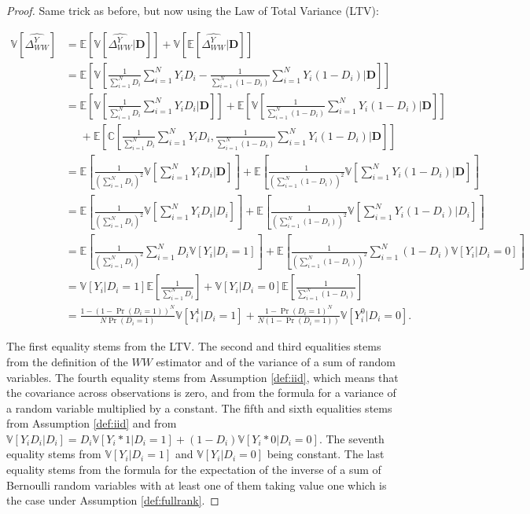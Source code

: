 \documentclass[
]{book}
\newcommand{\esp}[1]{\mathbb{E}[ #1 ]}
\newcommand{\var}[1]{\mathbb{V}[ #1 ]}
\newcommand{\cov}[1]{\mathbb{C}[ #1 ]}
\theoremstyle{definition}
\theoremstyle{definition}
\theoremstyle{definition}
\theoremstyle{definition}
\theoremstyle{remark}
\begin{document}
\begin{proof}
\iffalse{} {Proof. } \fi{}Same trick as before, but now using the Law of Total Variance (LTV):

\begin{align*}
\var{{\hat{\Delta^Y_{WW}}}} & = \esp{\var{\hat{\Delta^Y_{WW}}|\mathbf{D}}}+\var{\esp{\hat{\Delta^Y_{WW}}|\mathbf{D}}}\\
                            & = \esp{\var{\frac{1}{\sum_{i=1}^N D_i}\sum_{i=1}^N Y_iD_i-\frac{1}{\sum_{i=1}^N (1-D_i)}\sum_{i=1}^N Y_i(1-D_i)|\mathbf{D}}} \\
                            & = \esp{\var{\frac{1}{\sum_{i=1}^N D_i}\sum_{i=1}^N Y_iD_i|\mathbf{D}}}+\esp{\var{\frac{1}{\sum_{i=1}^N (1-D_i)}\sum_{i=1}^N Y_i(1-D_i)|\mathbf{D}}}\\
                            & \phantom{=}+\esp{\cov{\frac{1}{\sum_{i=1}^N D_i}\sum_{i=1}^N Y_iD_i,\frac{1}{\sum_{i=1}^N (1-D_i)}\sum_{i=1}^N Y_i(1-D_i)|\mathbf{D}}} \\
                            & = \esp{\frac{1}{(\sum_{i=1}^N D_i)^2}\var{\sum_{i=1}^N Y_iD_i|\mathbf{D}}}+\esp{\frac{1}{(\sum_{i=1}^N (1-D_i))^2}\var{\sum_{i=1}^N Y_i(1-D_i)|\mathbf{D}}} \\
                            & = \esp{\frac{1}{(\sum_{i=1}^N D_i)^2}\var{\sum_{i=1}^N Y_iD_i|D_i}}+\esp{\frac{1}{(\sum_{i=1}^N (1-D_i))^2}\var{\sum_{i=1}^N Y_i(1-D_i)|D_i}} \\
                            & = \esp{\frac{1}{(\sum_{i=1}^N D_i)^2}\sum_{i=1}^ND_i\var{Y_i|D_i=1}}+\esp{\frac{1}{(\sum_{i=1}^N (1-D_i))^2}\sum_{i=1}^N(1-D_i)\var{Y_i|D_i=0}} \\
                            & = \var{Y_i|D_i=1}\esp{\frac{1}{\sum_{i=1}^N D_i}}+\var{Y_i|D_i=0}\esp{\frac{1}{\sum_{i=1}^N (1-D_i)}} \\
                            & = \frac{1-(1-\Pr(D_i=1))^N}{N\Pr(D_i=1)}\var{Y_i^1|D_i=1}+\frac{1-\Pr(D_i=1)^N}{N(1-\Pr(D_i=1))}\var{Y_i^0|D_i=0}.
\end{align*}

The first equality stems from the LTV.
The second and third equalities stems from the definition of the \(WW\) estimator and of the variance of a sum of random variables.
The fourth equality stems from Assumption \ref{def:iid}, which means that the covariance across observations is zero, and from the formula for a variance of a random variable multiplied by a constant.
The fifth and sixth equalities stems from Assumption \ref{def:iid} and from \(\var{Y_iD_i|D_i}=D_i\var{Y_i*1|D_i=1}+(1-D_i)\var{Y_i*0|D_i=0}\).
The seventh equality stems from \(\var{Y_i|D_i=1}\) and \(\var{Y_i|D_i=0}\) being constant.
The last equality stems from the formula for the expectation of the inverse of a sum of Bernoulli random variables with at least one of them taking value one which is the case under Assumption \ref{def:fullrank}.
\end{proof}
\end{document}
